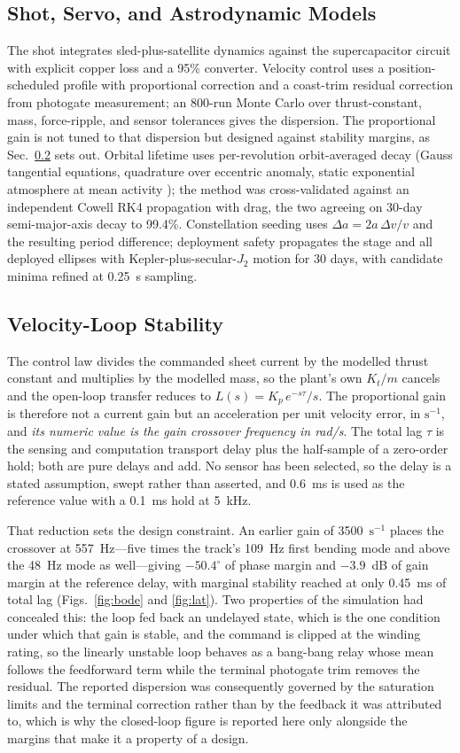 \documentclass[conference]{IEEEtran}
\begin{document}
\subsection{Shot, Servo, and Astrodynamic Models}
The shot integrates sled-plus-satellite dynamics against the supercapacitor circuit with explicit copper loss and a 95\% converter. Velocity control uses a position-scheduled profile with proportional correction and a coast-trim residual correction from photogate measurement; an 800-run Monte Carlo over thrust-constant, mass, force-ripple, and sensor tolerances gives the dispersion. The proportional gain is not tuned to that dispersion but designed against stability margins, as Sec.~\ref{sec:control} sets out. Orbital lifetime uses per-revolution orbit-averaged decay (Gauss tangential equations, quadrature over eccentric anomaly, static exponential atmosphere at mean activity \cite{vallado}); the method was cross-validated against an independent Cowell RK4 propagation with drag, the two agreeing on 30-day semi-major-axis decay to 99.4\%. Constellation seeding uses $\Delta a = 2a\,\Delta v/v$ and the resulting period difference; deployment safety propagates the stage and all deployed ellipses with Kepler-plus-secular-$J_2$ motion for 30 days, with candidate minima refined at 0.25~s sampling.

\subsection{Velocity-Loop Stability}\label{sec:control}
The control law divides the commanded sheet current by the modelled thrust constant and multiplies by the modelled mass, so the plant's own $K_t/m$ cancels and the open-loop transfer reduces to $L(s)=K_p\,e^{-s\tau}/s$. The proportional gain is therefore not a current gain but an acceleration per unit velocity error, in $\mathrm{s^{-1}}$, and \emph{its numeric value is the gain crossover frequency in rad/s}. The total lag $\tau$ is the sensing and computation transport delay plus the half-sample of a zero-order hold; both are pure delays and add. No sensor has been selected, so the delay is a stated assumption, swept rather than asserted, and 0.6~ms is used as the reference value with a 0.1~ms hold at 5~kHz.

That reduction sets the design constraint. An earlier gain of 3500~$\mathrm{s^{-1}}$ places the crossover at 557~Hz---five times the track's 109~Hz first bending mode and above the 48~Hz mode as well---giving $-50.4^\circ$ of phase margin and $-3.9$~dB of gain margin at the reference delay, with marginal stability reached at only 0.45~ms of total lag (Figs.~\ref{fig:bode} and \ref{fig:lat}). Two properties of the simulation had concealed this: the loop fed back an undelayed state, which is the one condition under which that gain is stable, and the command is clipped at the winding rating, so the linearly unstable loop behaves as a bang-bang relay whose mean follows the feedforward term while the terminal photogate trim removes the residual. The reported dispersion was consequently governed by the saturation limits and the terminal correction rather than by the feedback it was attributed to, which is why the closed-loop figure is reported here only alongside the margins that make it a property of a design.
\end{document}
